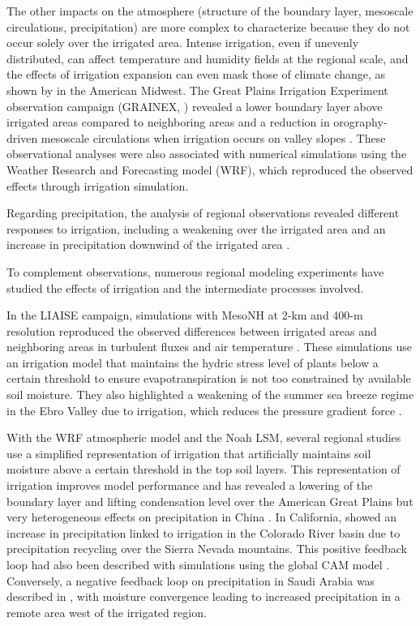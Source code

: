 The other impacts on the atmosphere (structure of the boundary layer, mesoscale circulations, precipitation) are more complex to characterize because they do not occur solely over the irrigated area. Intense irrigation, even if unevenly distributed, can affect temperature and humidity fields at the regional scale, and the effects of irrigation expansion can even mask those of climate change, as shown by \citet{nocco_observation_2019} in the American Midwest. The Great Plains Irrigation Experiment observation campaign (GRAINEX, \cite{rappin_great_2021}) revealed a lower boundary layer above irrigated areas compared to neighboring areas \citep{rappin_landatmosphere_2022} and a reduction in orography-driven mesoscale circulations when irrigation occurs on valley slopes \citep{phillips_influence_2022}. These observational analyses were also associated with numerical simulations using the Weather Research and Forecasting model (WRF), which reproduced the observed effects through irrigation simulation.

Regarding precipitation, the analysis of regional observations revealed different responses to irrigation, including a weakening over the irrigated area \citep{alter_rainfall_2015} and an increase in precipitation downwind of the irrigated area \citep{deangelis_evidence_2010}.

To complement observations, numerous regional modeling experiments have studied the effects of irrigation and the intermediate processes involved.

In the LIAISE campaign, simulations with MesoNH at 2-km and 400-m resolution reproduced the observed differences between irrigated areas and neighboring areas in turbulent fluxes and air temperature \citep{lunel_irrigation_2024}. These simulations use an irrigation model that maintains the hydric stress level of plants below a certain threshold to ensure evapotranspiration is not too constrained by available soil moisture. They also highlighted a weakening of the summer sea breeze regime in the Ebro Valley due to irrigation, which reduces the pressure gradient force \citep{lunel_marinada_2024}.

With the WRF atmospheric model and the Noah LSM, several regional studies use a simplified representation of irrigation that artificially maintains soil moisture above a certain threshold in the top soil layers. This representation of irrigation improves model performance and has revealed a lowering of the boundary layer and lifting condensation level over the American Great Plains \citep{qian_modeling_2013} but very heterogeneous effects on precipitation in China \citep{liu_simulating_2021}. In California, \citet{yang_impact_2017} showed an increase in precipitation linked to irrigation in the Colorado River basin due to precipitation recycling over the Sierra Nevada mountains. This positive feedback loop had also been described with simulations using the global CAM model \citep{lo_irrigation_2013}. Conversely, a negative feedback loop on precipitation in Saudi Arabia was described in \citep{lo_intense_2021}, with moisture convergence leading to increased precipitation in a remote area west of the irrigated region.

